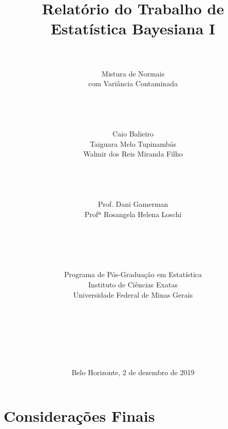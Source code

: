 \documentclass[12pt,reqno,a4paper,oneside]{article}
\begin{document}
\title{\huge Relatório do Trabalho de\\
	Estatística Bayesiana I}
\author{\\
	\\
	\huge Mistura de Normais\\
	\huge com Variância Contaminada\\
	\\
	\\
	\\
	\\
	\Large Caio Balieiro\\
	\Large Taiguara Melo Tupinambás\\
	\Large Walmir dos Reis Miranda Filho\\
	\\
	\\
	\\
	\\
	\Large Prof. Dani Gamerman\\
	\Large Profª Rosangela Helena Loschi\\
	\\
	\\
	\\
	\\
	\\
	Programa de Pós-Graduação em Estatística\\
	Instituto de Ciências Exatas\\
	Universidade Federal de Minas Gerais\\
	\\
	\\
	\\
	\\
	\\
	\\}
\date{Belo Horizonte, 2 de dezembro de 2019}
\maketitle

\newpage






\section{Considerações Finais}\label{consfin}

\end{document}
